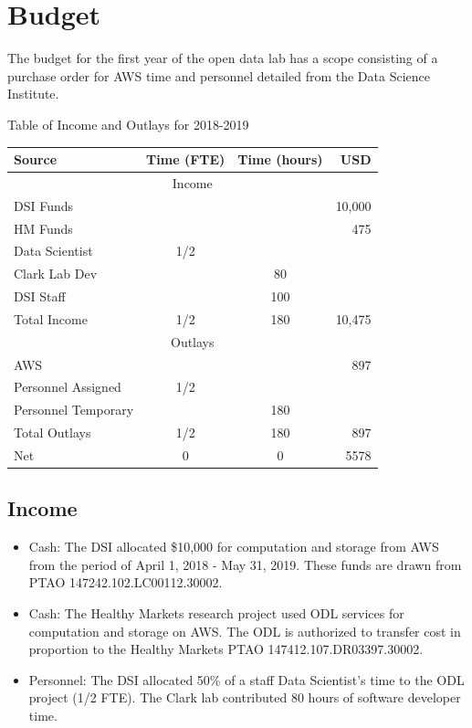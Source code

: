 \section{Budget} %
The budget for the first year of the open data lab has a scope consisting of a purchase order for AWS time and personnel detailed from the Data Science Institute.

\begin{center}
Table of Income and Outlays for 2018-2019

\begin{tabular}{lccr}
\hline
\hline
Source & Time (FTE) & Time (hours) & USD \\
\hline
\multicolumn{4}{c}{Income} \\
\hline
DSI Funds & && 10,000 \\
HM Funds & && 475 \\
Data Scientist & 1/2 & & \\
Clark Lab Dev & & 80 & \\
DSI Staff & & 100 & \\
\hline
Total Income & 1/2  & 180 & 10,475 \\
\hline
\hline
\multicolumn{4}{c}{Outlays} \\
\hline
AWS & && 897 \\
Personnel Assigned & 1/2  &  & \\
Personnel Temporary & & 180 & \\
\hline
Total Outlays & 1/2  & 180 & 897 \\
\hline
\hline
Net & 0 & 0 & 5578 \\
\hline
\hline
\end{tabular}
\end{center}

\subsection{Income}
\begin{itemize}
\item Cash: The DSI allocated \$10,000 for computation and storage from AWS from the period of April 1, 2018 - May 31, 2019. These funds are drawn from PTAO 147242.102.LC00112.30002.
\item Cash: The Healthy Markets research project used ODL services for computation and storage on AWS. The ODL is authorized to transfer cost in proportion to the Healthy Markets PTAO 147412.107.DR03397.30002.
\item Personnel: The DSI allocated 50\% of a staff Data Scientist's time to the ODL project (1/2 FTE). The Clark lab contributed 80 hours of software developer time.
\end{itemize}
